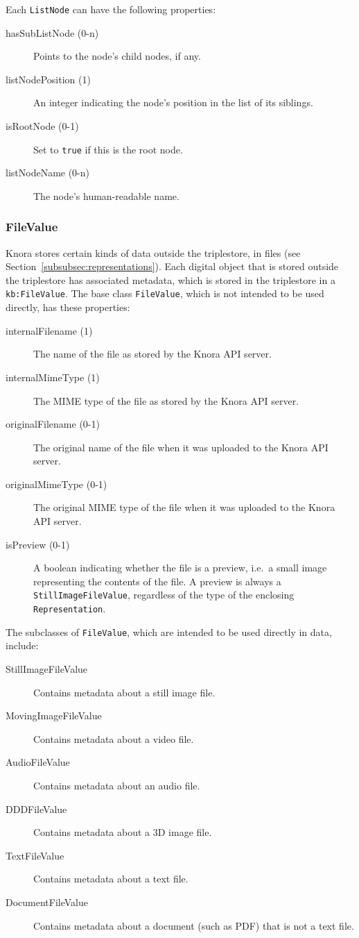 \documentclass[12pt, a4paper]{article}
\begin{document}
Each \texttt{ListNode} can have the following properties:

\begin{description}
	\item[hasSubListNode (0-n)] Points to the node's child nodes, if any.
	\item[listNodePosition (1)] An integer indicating the node's position in the list of its siblings.
	\item[isRootNode (0-1)] Set to \texttt{true} if this is the root node.
	\item[listNodeName (0-n)] The node's human-readable name.
\end{description}

\subsubsection{FileValue}

\label{subsubsec:filevalue}

Knora stores certain kinds of data outside the triplestore, in files (see Section~\ref{subsubsec:representations}). Each digital object that is stored outside the triplestore has associated metadata, which is stored in the triplestore in a \texttt{kb:FileValue}. The base class \texttt{FileValue}, which is not intended to be used directly, has these properties:

\begin{description}
	\item[internalFilename (1)] The name of the file as stored by the Knora API server.
	\item[internalMimeType (1)] The MIME type of the file as stored by the Knora API server.
	\item[originalFilename (0-1)] The original name of the file when it was uploaded to the Knora API server.
	\item[originalMimeType (0-1)] The original MIME type of the file when it was uploaded to the Knora API server.
	\item[isPreview (0-1)] A boolean indicating whether the file is a preview, i.e.\ a small image representing the contents of the file. A preview is always a \texttt{Still\-Image\-File\-Value}, regardless of the type of the enclosing \texttt{Representation}.
\end{description}

The subclasses of \texttt{FileValue}, which are intended to be used directly in data, include:

\begin{description}
	\item[StillImageFileValue] Contains metadata about a still image file.
	\item[MovingImageFileValue] Contains metadata about a video file.
	\item[AudioFileValue] Contains metadata about an audio file.
	\item[DDDFileValue] Contains metadata about a 3D image file.
	\item[TextFileValue] Contains metadata about a text file.
	\item[DocumentFileValue] Contains metadata about a document (such as PDF) that is not a text file.
\end{description}
\end{document}
